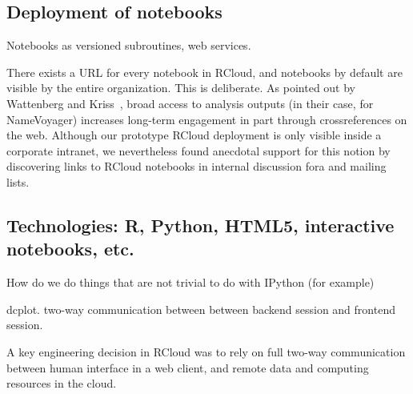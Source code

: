 \subsection{Deployment of notebooks\label{sec:deployment}}

Notebooks as versioned subroutines, web services.

There exists a URL for every notebook in RCloud, and notebooks by
default are visible by the entire organization. This is deliberate.
As pointed out by Wattenberg and Kriss~\cite{Wattenberg:2011:DFS},
broad access to analysis outputs (in their case, for NameVoyager)
increases long-term engagement in part through crossreferences on
the web. Although our prototype RCloud deployment is only visible
inside a corporate intranet, we nevertheless found anecdotal support
for this notion by discovering links to RCloud notebooks in internal
discussion fora and mailing lists.

\subsection{Technologies: R, Python, HTML5, interactive notebooks, etc.}

How do we do things that are not trivial to do with IPython (for example)

dcplot. two-way communication between between backend session and
frontend session.

A key engineering decision in RCloud was to rely on full two-way
communication between human interface in a web client, and remote
data and computing resources in the cloud.
